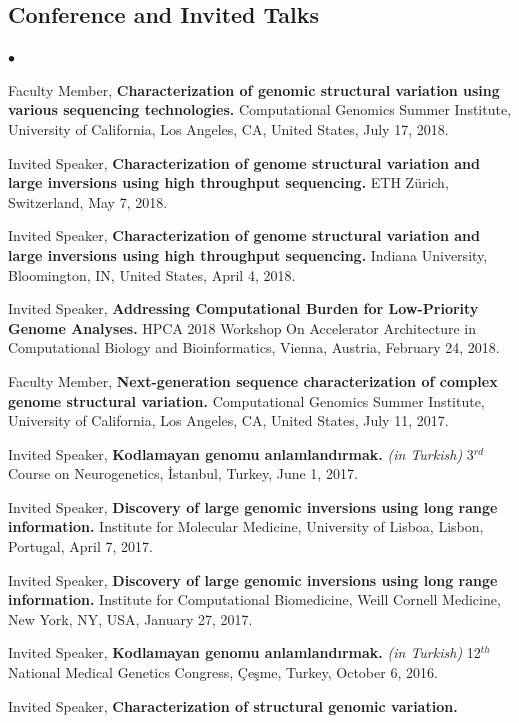 \documentclass[margin,line]{res}
\newenvironment{list2}{
  \begin{list}{$\bullet$}{%
      \setlength{\itemsep}{0in}
      \setlength{\parsep}{0in} \setlength{\parskip}{0in}
      \setlength{\topsep}{0in} \setlength{\partopsep}{0in} 
      \setlength{\leftmargin}{0.2in}}}{\end{list}}
\begin{document}
\begin{resume}
\vspace*{-.2cm}
\section{\sc Conference and Invited Talks}

\begin{list2}
\item
  Faculty Member, 
  {\bf  Characterization of genomic structural variation using various sequencing technologies.}
  Computational Genomics Summer Institute, University of California, Los Angeles, CA, United States,
  July 17, 2018.
\item
  Invited Speaker, 
  {\bf  Characterization of  genome structural variation and large inversions using high throughput sequencing.}
  ETH Zürich, Switzerland, May 7, 2018.
\item
  Invited Speaker, 
  {\bf  Characterization of  genome structural variation and large inversions using high throughput sequencing.}
  Indiana University, Bloomington, IN, United States, April 4, 2018.
\item
  Invited Speaker, 
  {\bf Addressing Computational Burden for Low-Priority Genome Analyses.}
  HPCA 2018 Workshop On Accelerator Architecture in Computational Biology and Bioinformatics,
  Vienna, Austria, February 24, 2018.
\item
  Faculty Member, 
  {\bf  Next-generation sequence characterization of complex genome structural variation.}
  Computational Genomics Summer Institute, University of California, Los Angeles, CA, United States,
  July 11, 2017.
\item
  Invited Speaker, 
  {\bf Kodlamayan genomu anlamlandırmak.} {\it (in Turkish)}
  3$^{rd}$ Course on Neurogenetics, İstanbul, Turkey, June 1, 2017.
\item
  Invited Speaker, 
  {\bf Discovery of large genomic inversions using long range information.}
  Institute for Molecular Medicine, University of Lisboa, Lisbon, Portugal, April 7, 2017.
\item
  Invited Speaker, 
  {\bf Discovery of large genomic inversions using long range information.}
  Institute for Computational Biomedicine, Weill Cornell Medicine, New York, NY, USA, January 27, 2017.
\item
  Invited Speaker, 
  {\bf Kodlamayan genomu anlamlandırmak.} {\it (in Turkish)}
  12$^{th}$ National Medical Genetics Congress, Çeşme, Turkey, October 6, 2016.
\item
  Invited Speaker, 
  {\bf Characterization of structural genomic variation.}

\end{list2}
\end{resume}
\end{document}
